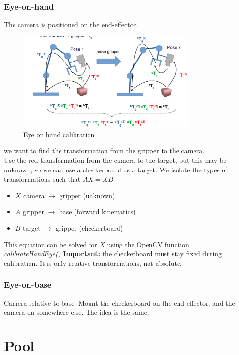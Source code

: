 \documentclass[a4paper]{article}
\begin{document}
\subsubsection*{Eye-on-hand}
The camera is positioned on the end-effector.
\begin{figure}[H]
\centering
\includegraphics[width=0.8\textwidth]{figures/eye_on_hand.png}
\caption{Eye on hand calibration}
\label{fig:eye_on_hand}
\end{figure} 

we want to find the transformation from the gripper to the camera. \\
Use the red transformation from the camera to the target, but this may be unknown, so we can use a checkerboard as a target. 
We isolate the types of transformations such that $ AX = XB $
\begin{itemize}
	\item $ X $ camera $ \rightarrow $ gripper (unknown)
	\item $ A $ gripper $ \rightarrow $ base (forward kinematics)
	\item $ B $ target $ \rightarrow $ gripper (checkerboard)
\end{itemize}
This equation can be solved for $ X $ using the OpenCV function \textit{calibrateHandEye()} 
\textbf{Important:} the checkerboard must stay fixed during calibration. It is only relative transformations, not absolute. 

\subsubsection*{Eye-on-base}
Camera relative to base. 
Mount the checkerboard on the end-effector, and the camera on somewhere else. 
The idea is the same. 

\newpage
\centering
\section{Pool}
\raggedright
\newpage
\end{document}
